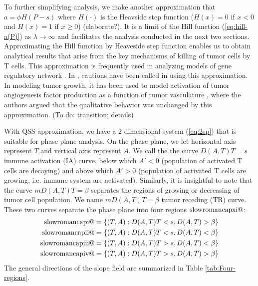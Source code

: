 \documentclass[review,authoryear]{elsarticle}
\makeatletter
\newcommand*{\rom}[1]{\expandafter\@slowromancap\romannumeral #1@}
\makeatother
\begin{document}
To further simplifying analysis, we make another approximation that $a=\phi H(P-s)$
where $H(\cdot)$ is the Heavside step function ($H(x)=0$ if $x<0$
and $H(x)=1$ if $x\ge0$) (elaborate?). It is a limit of the Hill
function (\ref{eq:hill-a(P)}) as $\lambda\to\infty$ and facilitates the analysis conducted
in the next two sections. Approximating the Hill function by Heaveside
step function enables us to obtain analytical results that arise from
the key mechanisms of killing of tumor cells by T cells. This approximation
is frequently used in analyzing models of gene regulatory network
 \citep[e.g.][]{Glass1973,Mestl1995}. In \citet{Polynikis2009},
cautions have been called in using this approximation. In modeling
tumor growth, it has been used to model activation of tumor angiogenesis
factor production as a function of tumor vasculature \citep{Stamper2007},
where the authors argued that the qualitative behavior was unchanged
by this approximation. (To do: transition; details)


With QSS approximation, we have a 2-dimensional system (\ref{eq:2sp}) that is suitable
for phase plane analysis. On the phase plane, we let horizontal axis
represent $T$ and vertical axis represent $A$. We call the the curve
$D(A,T)T=s$ immune activation (IA) curve, below which $A'<0$ (population
of activated T cells are decaying) and above which $A'>0$ (population
of activated T cells are growing, i.e. immune system are activated).
Similarly, it is insightful to note that the curve $mD(A,T)T=\beta$
separates the regions of  growing or decreasing of tumor cell population. We name
$mD(A,T)T=\beta$ tumor receding (TR) curve. These two curves separate
the phase plane into four regions $\text{\rom{11}}$: 
\begin{align*} 
\text{\rom{1}} &=  \{(T,A): D(A,T)T<s, D(A,T)>\beta \} \\ 
\text{\rom{2}} &=  \{(T,A): D(A,T)T<s, D(A,T)<\beta \} \\ 
\text{\rom{3}} &=  \{(T,A): D(A,T)T>s, D(A,T)<\beta \} \\ 
\text{\rom{4}} &=  \{(T,A): D(A,T)T>s, D(A,T)>\beta \} 
\end{align*}
 The general directions of the slope
field are summarized in Table \ref{tab:Four-regions}. 
\end{document}
